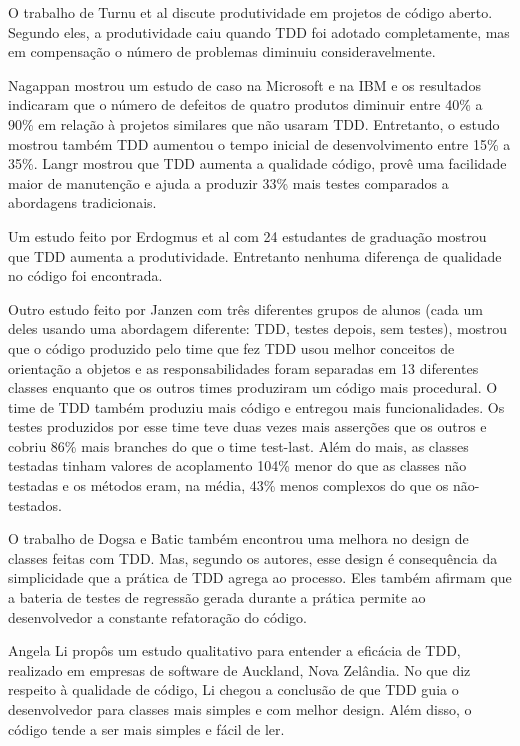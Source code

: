 O trabalho de Turnu et al \cite{turnu-tdd-opensouce} discute produtividade em
projetos de código aberto. Segundo eles, a produtividade caiu quando TDD foi
adotado completamente, mas em compensação o número de problemas diminuiu 
consideravelmente.

Nagappan \cite{nagappan-ms} mostrou um estudo de caso na Microsoft e na IBM e os
resultados indicaram que o número de defeitos de quatro produtos diminuir entre 
40\% a 90\% em relação à projetos similares que não usaram TDD. Entretanto, o 
estudo mostrou também TDD aumentou o tempo inicial de desenvolvimento entre 15\%
a 35\%. Langr \cite{langr} mostrou que TDD aumenta a qualidade código, provê uma 
facilidade maior de manutenção e ajuda a produzir 33\% mais testes comparados  a
abordagens tradicionais.

Um estudo feito por Erdogmus et al \cite{erdogmus-morisio} com 24 estudantes de
graduação mostrou que TDD aumenta a produtividade. Entretanto nenhuma diferença 
de qualidade no código foi encontrada.

Outro estudo feito por Janzen \cite{janzen-saiedian} com três diferentes grupos
de alunos (cada um deles usando uma abordagem diferente: TDD, testes depois, sem
testes), mostrou que o código produzido pelo time que fez TDD usou melhor
conceitos de orientação a objetos e as responsabilidades foram separadas em 13 
diferentes classes enquanto que os outros times produziram um código mais
procedural. O time de TDD também produziu mais código e entregou mais
funcionalidades. Os testes produzidos por esse time teve duas vezes mais
asserções que os outros e cobriu 86\% mais branches do que o time test-last. 
Além do mais, as classes testadas tinham valores de acoplamento 104\% menor do 
que as classes não testadas e os métodos eram, na média, 43\% menos complexos 
do que os não-testados.

O trabalho de Dogsa e Batic \cite{dogsa-batic} também encontrou uma melhora no
design de classes feitas com TDD. Mas, segundo os autores, esse design é 
consequência da simplicidade que a prática de TDD agrega ao processo. Eles
também  afirmam que a bateria de testes de regressão gerada durante a prática 
permite ao desenvolvedor a constante refatoração do código.

Angela Li \cite{angela-li} propôs um estudo qualitativo para
entender a eficácia de TDD, realizado em empresas de software de Auckland, Nova
Zelândia. No que diz respeito à qualidade de código, Li chegou a conclusão de
que TDD guia o desenvolvedor para classes mais simples e com melhor design. 
Além disso, o código tende a ser mais simples e fácil de ler.

